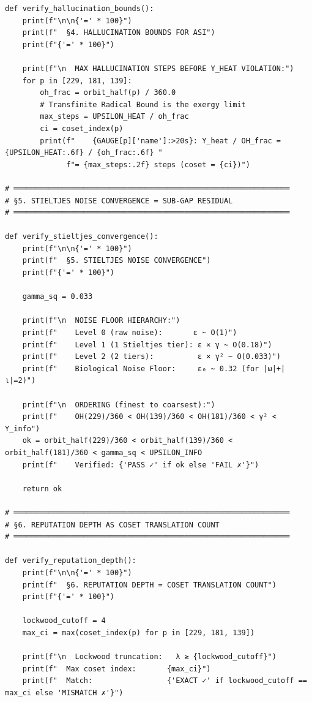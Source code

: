 \begin{verbatim}
def verify_hallucination_bounds():
    print(f"\n\n{'=' * 100}")
    print(f"  §4. HALLUCINATION BOUNDS FOR ASI")
    print(f"{'=' * 100}")

    print(f"\n  MAX HALLUCINATION STEPS BEFORE Υ_HEAT VIOLATION:")
    for p in [229, 181, 139]:
        oh_frac = orbit_half(p) / 360.0
        # Transfinite Radical Bound is the exergy limit
        max_steps = UPSILON_HEAT / oh_frac
        ci = coset_index(p)
        print(f"    {GAUGE[p]['name']:>20s}: Υ_heat / OH_frac = {UPSILON_HEAT:.6f} / {oh_frac:.6f} "
              f"= {max_steps:.2f} steps (coset = {ci})")

# ═══════════════════════════════════════════════════════════════
# §5. STIELTJES NOISE CONVERGENCE = SUB-GAP RESIDUAL
# ═══════════════════════════════════════════════════════════════

def verify_stieltjes_convergence():
    print(f"\n\n{'=' * 100}")
    print(f"  §5. STIELTJES NOISE CONVERGENCE")
    print(f"{'=' * 100}")

    gamma_sq = 0.033
    
    print(f"\n  NOISE FLOOR HIERARCHY:")
    print(f"    Level 0 (raw noise):       ε ~ O(1)")
    print(f"    Level 1 (1 Stieltjes tier): ε × γ ~ O(0.18)")
    print(f"    Level 2 (2 tiers):          ε × γ² ~ O(0.033)")
    print(f"    Biological Noise Floor:     ε₀ ~ 0.32 (for |ω|+|ι|=2)")
    
    print(f"\n  ORDERING (finest to coarsest):")
    print(f"    OH(229)/360 < OH(139)/360 < OH(181)/360 < γ² < Υ_info")
    ok = orbit_half(229)/360 < orbit_half(139)/360 < orbit_half(181)/360 < gamma_sq < UPSILON_INFO
    print(f"    Verified: {'PASS ✓' if ok else 'FAIL ✗'}")
    
    return ok

# ═══════════════════════════════════════════════════════════════
# §6. REPUTATION DEPTH AS COSET TRANSLATION COUNT  
# ═══════════════════════════════════════════════════════════════

def verify_reputation_depth():
    print(f"\n\n{'=' * 100}")
    print(f"  §6. REPUTATION DEPTH = COSET TRANSLATION COUNT")
    print(f"{'=' * 100}")

    lockwood_cutoff = 4
    max_ci = max(coset_index(p) for p in [229, 181, 139])

    print(f"\n  Lockwood truncation:   λ ≥ {lockwood_cutoff}")
    print(f"  Max coset index:       {max_ci}")
    print(f"  Match:                 {'EXACT ✓' if lockwood_cutoff == max_ci else 'MISMATCH ✗'}")


\end{verbatim}
